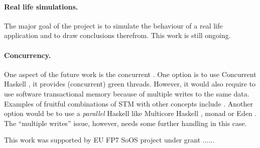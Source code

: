 \paragraph{Real life simulations.} The major goal of the project is to
simulate the behaviour of a real life application and to draw
conclusions therefrom. This work is still ongoing.

\paragraph{Concurrency.} One aspect of the future work is the
concurrent \soosim. One option is to use Concurrent Haskell
\cite{ConcHs}, it provides (concurrent) green threads. However, it
would also require to use software transactional memory
\cite{springerlink:10.1007/s004460050028} because of multiple writes
to the same data. Examples of fruitful combinations of STM with other
concepts include
\cite{Harris:2008:CMT:1378704.1378725,Bieniusa:2010:BAA:1835698.1835714}.
Another option would be to use a \emph{parallel} Haskell like
Multicore Haskell \cite{marlow:rsm},  monad \cite{par-monad}
or Eden \cite{eden}. The ``multiple writes'' issue, however, needs
some further handling in this case.

%

\acks

This work was supported by EU FP7 SoOS project under grant ......

